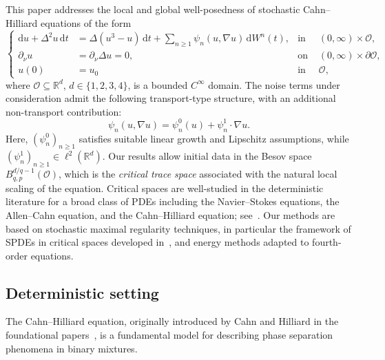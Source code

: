 \documentclass[reqno]{amsart}
\newcommand{\R}{\mathbb{R}}
\newcommand{\sO}{\mathscr{O}}
\newcommand{\seq}{\subseteq}
\newcommand{\1}{\mathbf{1}}
\newcommand{\dt}{\,\mathrm{d}t}
\newcommand{\dd}{\ensuremath{\mathrm{d}}}
\begin{document}
This paper addresses the local and global well-posedness of stochastic Cahn--Hilliard equations of the form
\begin{equation}\tag{SCH}\label{eq:intro:SPDE}
    \left\{
    \begin{aligned}
        \dd u+ \Delta^2u \dt&= \Delta(u^3-u)\dt+ \sum_{n\ge 1} \psi_n(u,\nabla u)\,\dd W^n(t),&\text{in }& (0,\infty)\times\sO,\\
        \partial_\nu u&=\partial_\nu\Delta u=0, &\text{on }&(0,\infty)\times \partial \sO,\\
        u(0)&=u_0 &\text{in }&\sO,
    \end{aligned}
    \right.
\end{equation}
where $\sO\seq \R^d$, $d\in\{1,2,3,4\}$, is a bounded $C^\infty$ domain.
The noise terms under consideration admit the following transport-type structure, with an additional non-transport contribution:
\begin{equation}
    \psi_n(u,\nabla u)= \psi_n^0(u) + \psi_n^1\cdot\nabla u.
\end{equation}
Here, $(\psi^0_n)_{n\geq 1}$ satisfies suitable linear growth and Lipschitz assumptions, while $(\psi_n^1)_{n\ge 1}\in \ell^2(\R^d)$.
Our results allow initial data in the Besov space $B_{q,p}^{d/q-1}(\sO)$, which is the \emph{critical trace space} associated with the natural local scaling of the equation. Critical spaces are well-studied in the deterministic literature for a broad class of PDEs including the Navier--Stokes equations, the Allen--Cahn equation, and the Cahn--Hilliard equation; see~\cite{prussCriticalSpacesQuasilinear2018}. Our methods are based on stochastic maximal regularity techniques, in particular the framework of SPDEs in critical spaces developed in~\cite{agrestiNonlinearParabolicStochastic2022,agrestiNonlinearParabolicStochastic2022a, agrestiCriticalVariationalSetting2024a}, and energy methods adapted to fourth-order equations. 



\subsection{Deterministic setting}
The Cahn--Hilliard equation, originally introduced by Cahn and Hilliard in the foundational papers~\cite{CahnHilliard1958, CahnHilliard1959, Cahn1961}, is a fundamental model for describing phase separation phenomena in binary mixtures.
\end{document}
